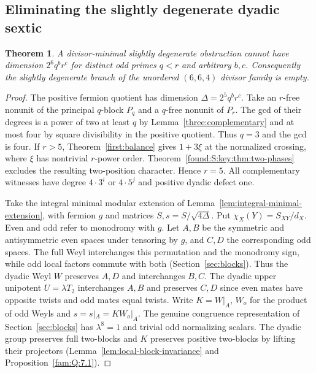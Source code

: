 \documentclass[11pt,a4paper]{article}
\numberwithin{equation}{section}
\newtheorem{theorem}{Theorem}[section]
\theoremstyle{remark}
\begin{document}
\subsection{Eliminating the slightly degenerate dyadic sextic}\label{found:S:7}
\label{found:S:key:sec:ferm-six}
\begin{theorem}\label{found:S:7.1}\label{found:S:key:thm:ferm-six}
A divisor-minimal slightly degenerate obstruction cannot have dimension
$2^6q^br^c$ for distinct odd primes $q<r$ and arbitrary $b,c$.
Consequently the slightly degenerate branch of the unordered $(6,6,4)$
divisor family is empty.
\end{theorem}
\begin{proof}
The positive fermion quotient has dimension $\Delta=2^5q^br^c$.
Take an $r$-free nonunit of the principal $q$-block $P_q$ and a
$q$-free nonunit of $P_r$. The gcd of their degrees is a power of two
at least $q$ by Lemma~\ref{three:complementary} and at most four by square
divisibility in the positive quotient. Thus $q=3$ and the gcd is four.
If $r>5$, Theorem~\ref{first:balance} gives $1+3\xi$ at the normalized crossing,
where $\xi$ has nontrivial $r$-power order. Theorem~\ref{found:S:key:thm:two-phases}
excludes the resulting two-position character. Hence $r=5$. All
complementary witnesses have degree $4\cdot3^i$ or $4\cdot5^j$ and
positive dyadic defect one.

Take the integral minimal modular extension of Lemma~\ref{lem:integral-minimal-extension}, with
fermion $g$ and matrices $S,s=S/\sqrt{4\Delta}$. Put
$\chi_X(Y)=S_{XY}/d_X$. Even and odd refer to monodromy with $g$.
Let $A,B$ be the symmetric and antisymmetric even spaces under tensoring
by $g$, and $C,D$ the corresponding odd spaces. The full Weyl
interchanges this permutation and the monodromy sign, while odd local factors commute with both (Section~\ref{sec:blocks}). Thus the dyadic Weyl $W$ preserves
$A,D$ and interchanges $B,C$. The dyadic upper unipotent $U=\lambda T_2$
interchanges $A,B$ and preserves $C,D$ since even mates have opposite
twists and odd mates equal twists. Write $K=W|_A$, $W_o$ for the
product of odd Weyls and $\widehat s=s|_A=K W_o|_A$. The genuine
congruence representation of Section~\ref{sec:blocks} has $\lambda^8=1$ and trivial
odd normalizing scalars. The dyadic group preserves full two-blocks
and $K$ preserves positive two-blocks by lifting their projectors (Lemma~\ref{lem:local-block-invariance} and Proposition~\ref{fam:Q:7.1}).


\end{proof}
\end{document}
